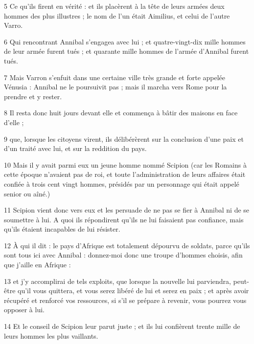 \par 5 Ce qu'ils firent en vérité : et ils placèrent à la tête de leurs armées deux hommes des plus illustres ; le nom de l'un était Aimilius, et celui de l'autre Varro.

\par 6 Qui rencontrant Annibal s'engagea avec lui ; et quatre-vingt-dix mille hommes de leur armée furent tués ; et quarante mille hommes de l'armée d'Annibal furent tués.

\par 7 Mais Varron s'enfuit dans une certaine ville très grande et forte appelée Vénusia : Annibal ne le poursuivit pas ; mais il marcha vers Rome pour la prendre et y rester.

\par 8 Il resta donc huit jours devant elle et commença à bâtir des maisons en face d'elle ;

\par 9 que, lorsque les citoyens virent, ils délibérèrent sur la conclusion d'une paix et d'un traité avec lui, et sur la reddition du pays.

\par 10 Mais il y avait parmi eux un jeune homme nommé Scipion (car les Romains à cette époque n'avaient pas de roi, et toute l'administration de leurs affaires était confiée à trois cent vingt hommes, présidés par un personnage qui était appelé senior ou aîné.)

\par 11 Scipion vient donc vers eux et les persuade de ne pas se fier à Annibal ni de se soumettre à lui. A quoi ils répondirent qu'ils ne lui faisaient pas confiance, mais qu'ils étaient incapables de lui résister.

\par 12 À qui il dit : le pays d'Afrique est totalement dépourvu de soldats, parce qu'ils sont tous ici avec Annibal : donnez-moi donc une troupe d'hommes choisis, afin que j'aille en Afrique :

\par 13 et j'y accomplirai de tels exploits, que lorsque la nouvelle lui parviendra, peut-être qu'il vous quittera, et vous serez libéré de lui et serez en paix ; et après avoir récupéré et renforcé vos ressources, si s'il se prépare à revenir, vous pourrez vous opposer à lui.

\par 14 Et le conseil de Scipion leur parut juste ; et ils lui confièrent trente mille de leurs hommes les plus vaillants.

